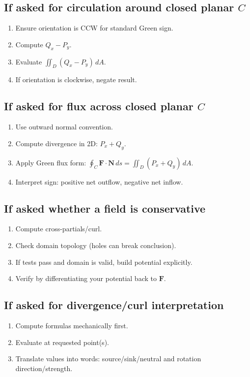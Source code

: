 \documentclass[12pt, twoside]{article}
\begin{document}
\subsection*{If asked for circulation around closed planar $C$}
\begin{enumerate}[leftmargin=*]
  \item Ensure orientation is CCW for standard Green sign.
  \item Compute $Q_x-P_y$.
  \item Evaluate $\iint_D(Q_x-P_y)\,dA$.
  \item If orientation is clockwise, negate result.
\end{enumerate}

\subsection*{If asked for flux across closed planar $C$}
\begin{enumerate}[leftmargin=*]
  \item Use outward normal convention.
  \item Compute divergence in 2D: $P_x+Q_y$.
  \item Apply Green flux form: $\oint_C\mathbf{F}\cdot\mathbf{N}\,ds=\iint_D(P_x+Q_y)\,dA$.
  \item Interpret sign: positive net outflow, negative net inflow.
\end{enumerate}

\subsection*{If asked whether a field is conservative}
\begin{enumerate}[leftmargin=*]
  \item Compute cross-partials/curl.
  \item Check domain topology (holes can break conclusion).
  \item If tests pass and domain is valid, build potential explicitly.
  \item Verify by differentiating your potential back to $\mathbf{F}$.
\end{enumerate}

\subsection*{If asked for divergence/curl interpretation}
\begin{enumerate}[leftmargin=*]
  \item Compute formulas mechanically first.
  \item Evaluate at requested point(s).
  \item Translate values into words: source/sink/neutral and rotation direction/strength.
\end{enumerate}
\end{document}
